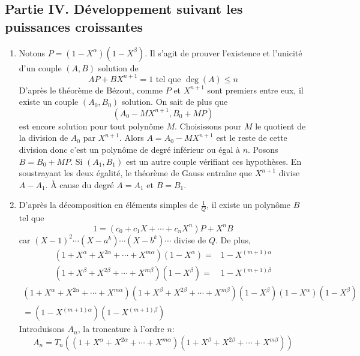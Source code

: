 \subsection*{Partie IV. Développement suivant les puissances croissantes}
\begin{enumerate}
 \item Notons $P=(1-X^\alpha)(1-X^\beta)$. Il s'agit de prouver l'existence et l'unicité d'un couple $(A,B)$ solution de
\begin{displaymath}
 AP+BX^{n+1}=1\text{ tel que } \deg(A)\leq n
\end{displaymath}
D'après le théorème de Bézout, comme $P$ et $X^{n+1}$ sont premiers entre eux, il existe un couple $(A_0,B_0)$ solution. On sait de plus que
\begin{displaymath}
 (A_0 - MX^{n+1} , B_0 + MP)
\end{displaymath}
est encore solution pour tout polynôme $M$.\newline
Choisissons pour $M$ le quotient de la division de $A_0$ par $X^{n+1}$. Alors $A = A_0 - MX^{n+1}$ est le reste de cette division donc c'est un polynôme de degré inférieur ou égal à $n$. Posons $B = B_0 + MP$.\newline
Si $(A_1,B_1)$ est un autre couple vérifiant ces hypothèses. En soustrayant les deux égalité, le théorème de Gauss entraîne que $X^{n+1}$ divise $A-A_1$. \`A cause du degré $A=A_1$ et $B=B_1$.
\item D'après la décomposition en éléments simples de $\frac{1}{Q}$, il existe un polynôme $B$ tel que
\begin{displaymath}
 1 = (c_0+c_1X+\cdots + c_nX^n)P + X^n B
\end{displaymath}
car $(X-1)^2 \cdots (X- a^k) \cdots  (X-b^k)\cdots$ divise de $Q$. De plus,
\begin{align*}
 (1+X^\alpha + X^{2\alpha}+\cdots+X^{m\alpha})(1-X^\alpha) =& 1 - X^{(m+1)\alpha} \\
(1+X^\beta + X^{2\beta}+\cdots+X^{m\beta})(1-X^\beta) =& 1 - X^{(m+1)\beta} 
\end{align*}
\begin{multline*}
 (1+X^\alpha + X^{2\alpha}+\cdots+X^{m\alpha})(1+X^\beta + X^{2\beta}+\cdots+X^{m\beta})(1-X^\beta)(1-X^\alpha)(1-X^\beta) \\
= (1 - X^{(m+1)\alpha})(1 - X^{(m+1)\beta})
\end{multline*}
Introduisons $A_n$, la troncature à l'ordre $n$:
\begin{displaymath}
 A_n = T_n \left( (1+X^\alpha + X^{2\alpha}+\cdots+X^{m\alpha}) (1+X^\beta + X^{2\beta}+\cdots+X^{m\beta})\right) 

\end{displaymath}
\end{enumerate}
